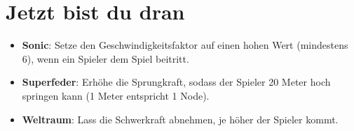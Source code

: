 \section{Jetzt bist du dran}\label{jetzt-bist-du-dran}

\begin{itemize}
\tightlist
\item
  \textbf{Sonic}: Setze den Geschwindigkeitsfaktor auf einen hohen Wert
  (mindestens 6), wenn ein Spieler dem Spiel beitritt.
\item
  \textbf{Superfeder}: Erhöhe die Sprungkraft, sodass der Spieler 20
  Meter hoch springen kann (1 Meter entspricht 1 Node).
\item
  \textbf{Weltraum}: Lass die Schwerkraft abnehmen, je höher der Spieler
  kommt.
\end{itemize}
